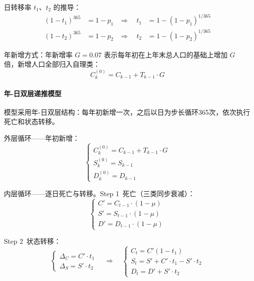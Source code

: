 \documentclass[12pt,a4paper]{article}
\begin{document}
日转移率 $t_1$、$t_2$ 的推导：
\begin{align}
(1-t_1)^{365} &= 1 - p_1 &\Rightarrow\quad t_1 &= 1 - (1 - p_1)^{1/365} \tag{1.3}\\
(1-t_2)^{365} &= 1 - p_2 &\Rightarrow\quad t_2 &= 1 - (1 - p_2)^{1/365} \tag{1.4}
\end{align}

年新增方式：年新增率 $G=0.07$ 表示每年初在上年末总人口的基础上增加 $G$ 倍，新增人口全部归入自理类：
\begin{equation}
C_{k}^{(0)} = C_{k-1} + T_{k-1} \cdot G
\tag{1.5}
\end{equation}

\paragraph{年-日双层递推模型}
模型采用年-日双层结构：每年初新增一次，之后以日为步长循环365次，依次执行死亡和状态转移。

外层循环——年初新增：
\begin{equation}
\begin{cases}
C_k^{(0)} = C_{k-1} + T_{k-1} \cdot G \\
S_k^{(0)} = S_{k-1} \\
D_k^{(0)} = D_{k-1}
\end{cases}
\tag{1.6}
\end{equation}

内层循环——逐日死亡与转移。Step 1~死亡（三类同步衰减）：
\begin{equation}
\begin{cases}
C' = C_{t-1} \cdot (1 - \mu) \\
S' = S_{t-1} \cdot (1 - \mu) \\
D' = D_{t-1} \cdot (1 - \mu)
\end{cases}
\tag{1.7}
\end{equation}

Step 2~状态转移：
\begin{equation}
\begin{cases}
\Delta_C = C' \cdot t_1 \\
\Delta_S = S' \cdot t_2
\end{cases}
\quad\Rightarrow\quad
\begin{cases}
C_t = C'(1 - t_1) \\
S_t = S' + C' \cdot t_1 - S' \cdot t_2 \\
D_t = D' + S' \cdot t_2
\end{cases}
\tag{1.8}
\end{equation}
\end{document}
